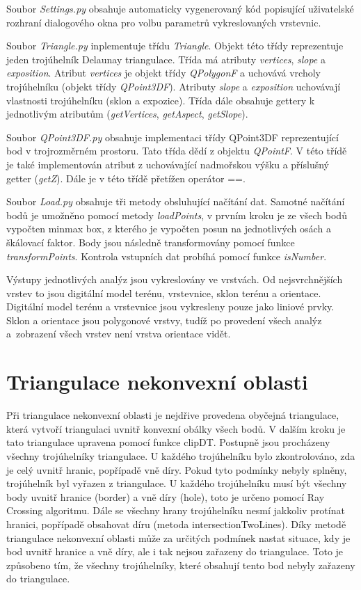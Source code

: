 \documentclass{article}
\begin{document}
\begin{spacing}{1.5}
Soubor \textit{Settings.py} obsahuje automaticky vygenerovaný kód popisující uživatelské rozhraní dialogového okna pro volbu parametrů vykreslovaných vrstevnic. 

Soubor \textit{Triangle.py} inplementuje třídu \textit{Triangle}. Objekt této třídy reprezentuje jeden trojúhelník Delaunay triangulace. Třída má atributy \textit{vertices}, \textit{slope} a \textit{exposition}. Atribut \textit{vertices} je objekt třídy \textit{QPolygonF} a uchovává vrcholy trojúhelníku (objekt třídy \textit{QPoint3DF}). Atributy \textit{slope} a \textit{exposition} uchovávají vlastnosti trojúhelníku (sklon a expozice). Třída dále obsahuje gettery k jednotlivým atributům (\textit{getVertices}, \textit{getAspect}, \textit{getSlope}).

Soubor \textit{QPoint3DF.py} obsahuje implementaci třídy QPoint3DF reprezentující bod v trojrozměrném prostoru. Tato třída dědí z objektu \textit{QPointF}. V této třídě je také implementován atribut z uchovávající nadmořskou výšku a příslušný getter (\textit{getZ}). Dále je v této třídě přetížen operátor ==.

Soubor \textit{Load.py} obsahuje tři metody obsluhující načítání dat. Samotné načítání bodů je umožněno pomocí metody \textit{loadPoints}, v prvním kroku je ze všech bodů vypočten minmax box, z kterého je vypočten posun na jednotlivých osách a škálovací faktor. Body jsou následně transformovány pomocí funkce \textit{transformPoints}. Kontrola vstupních dat probíhá pomocí funkce \textit{isNumber}.

Výstupy jednotlivých analýz jsou vykreslovány ve vrstvách. Od nejsvrchnějších vrstev to jsou digitální model terénu, vrstevnice, sklon terénu a orientace. Digitální model terénu  a vrstevnice jsou vykresleny pouze jako liniové prvky. Sklon a orientace jsou polygonové vrstvy, tudíž po provedení všech analýz a~zobrazení všech vrstev není vrstva orientace vidět.

\section{Triangulace nekonvexní oblasti}
Při triangulace nekonvexní oblasti je nejdřive provedena obyčejná triangulace, která vytvoří triangulaci uvnitř konvexní obálky všech bodů. V dalším kroku je tato triangulace upravena pomocí funkce clipDT. Postupně jsou procházeny všechny trojúhelníky triangulace. U každého trojúhelníku bylo zkontrolováno, zda je celý uvnitř hranic, popřípadě vně díry. Pokud tyto podmínky nebyly splněny, trojúhelník byl vyřazen z triangulace.
U každého trojúhelníku musí být všechny body uvnitř hranice (border) a vně díry (hole), toto je určeno pomocí Ray Crossing algoritmu. Dále se všechny hrany trojúhelníku nesmí jakkoliv protínat hranici, popřípadě obsahovat díru (metoda intersectionTwoLines).
Díky metodě triangulace nekonvexní oblasti může za určitých podmínek nastat situace, kdy je bod uvnitř hranice a vně díry, ale i tak nejsou zařazeny do triangulace. Toto je způsobeno tím, že všechny trojúhelníky, které obsahují tento bod nebyly zařazeny do triangulace.


\end{spacing}
\end{document}
